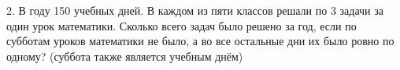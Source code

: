 2. В году 150 учебных дней. В каждом из пяти классов решали по 3 задачи за один урок математики. Сколько всего задач было решено за год, если по субботам уроков математики не было, а во все остальные дни их было ровно по одному? (суббота также является учебным днём)\\
